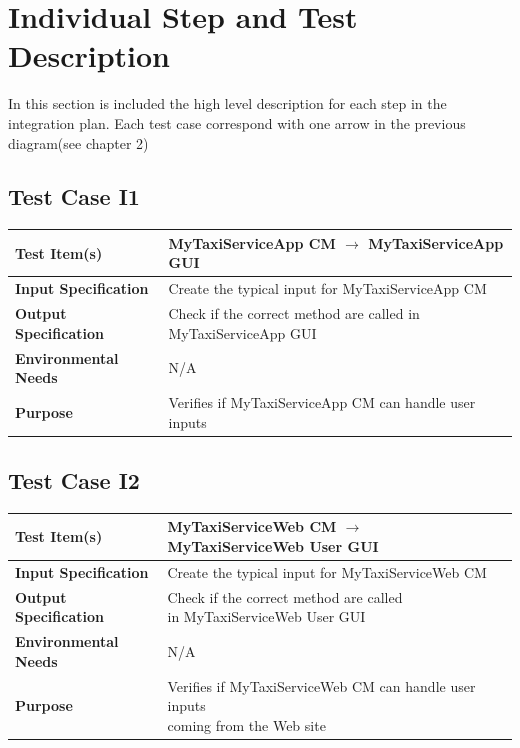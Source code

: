 \documentclass[11pt,titlepage]{article} %
\begin{document}
\newpage
\section{Individual Step and Test Description}
  In this section is included the high level description for each step in the integration plan.
  Each test case correspond with one arrow in the previous diagram(see chapter 2)
  
  \subsection{Test Case I1}
  \begin{table}[ht!]
    \begin{tabular*}{16cm}{ll}
	\hline
	\textbf{Test Item(s)} & MyTaxiServiceApp CM $ \longrightarrow $ MyTaxiServiceApp GUI \\
	\hline
	\textbf{Input Specification} & Create the typical input for MyTaxiServiceApp CM\\
	\hline
	\textbf{Output Specification} & Check if the correct method are called in MyTaxiServiceApp GUI\\
	\hline
	\textbf{Environmental Needs} & N/A\\
	\hline
	\textbf{Purpose} & Verifies if MyTaxiServiceApp CM can handle user inputs \\
	\hline
    \end{tabular*}
  \end{table}
  
  \subsection{Test Case I2}
  \begin{table}[ht!]
    \begin{tabular*}{16cm}{ll}
	\hline
	\textbf{Test Item(s)} & MyTaxiServiceWeb CM $ \longrightarrow $ MyTaxiServiceWeb User GUI \\
	\hline
	\textbf{Input Specification} & Create the typical input for MyTaxiServiceWeb CM\\
	\hline
	\textbf{Output Specification} & \pbox{20cm}{Check if the correct method are called \\ in MyTaxiServiceWeb User GUI} \\
	\hline
	\textbf{Environmental Needs} & N/A\\
	\hline
	\textbf{Purpose} & \pbox{20cm}{Verifies if MyTaxiServiceWeb CM can handle user inputs \\ coming from the Web site} \\
	\hline
    \end{tabular*}
  \end{table}
  
\end{document}
